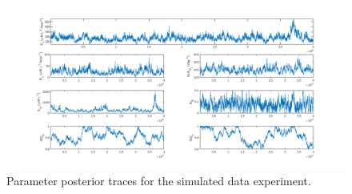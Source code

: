 \documentclass{ruthesis}
\begin{document}
\begin{figure}
	\centerline{\includegraphics[width=1.3\textwidth]{images_microalgae/posterior_plots_with_fake_data/model_parameters_traces}}
	\caption[.]{Parameter posterior traces for the simulated data experiment.}
	\label{fig:micro_sim_model_parameters_traces}
\end{figure}

{}


%
%
\end{document}
